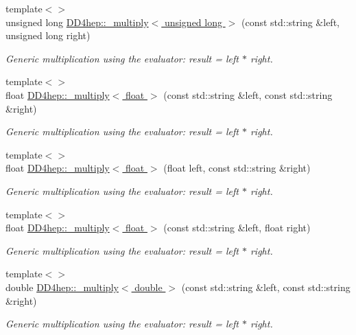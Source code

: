 \begin{DoxyCompactItemize}
{\footnotesize template$<$$>$ }\\unsigned long \hyperlink{group___d_d4_h_e_p___g_e_o_m_e_t_r_y_ga97440d35af9ad225e4307321a7735e59}{D\+D4hep\+::\+\_\+multiply$<$ unsigned long $>$} (const std\+::string \&left, unsigned long right)
\begin{DoxyCompactList}\small\item\em Generic multiplication using the evaluator\+: result = left $\ast$ right. \end{DoxyCompactList}\item 
{\footnotesize template$<$$>$ }\\float \hyperlink{group___d_d4_h_e_p___g_e_o_m_e_t_r_y_ga423913783efc6234ea872caa04c39917}{D\+D4hep\+::\+\_\+multiply$<$ float $>$} (const std\+::string \&left, const std\+::string \&right)
\begin{DoxyCompactList}\small\item\em Generic multiplication using the evaluator\+: result = left $\ast$ right. \end{DoxyCompactList}\item 
{\footnotesize template$<$$>$ }\\float \hyperlink{group___d_d4_h_e_p___g_e_o_m_e_t_r_y_ga745f4ee0b4b15f86d4992d11c7ca6f15}{D\+D4hep\+::\+\_\+multiply$<$ float $>$} (float left, const std\+::string \&right)
\begin{DoxyCompactList}\small\item\em Generic multiplication using the evaluator\+: result = left $\ast$ right. \end{DoxyCompactList}\item 
{\footnotesize template$<$$>$ }\\float \hyperlink{group___d_d4_h_e_p___g_e_o_m_e_t_r_y_gac92210239021647a7dc57e2838002263}{D\+D4hep\+::\+\_\+multiply$<$ float $>$} (const std\+::string \&left, float right)
\begin{DoxyCompactList}\small\item\em Generic multiplication using the evaluator\+: result = left $\ast$ right. \end{DoxyCompactList}\item 
{\footnotesize template$<$$>$ }\\double \hyperlink{group___d_d4_h_e_p___g_e_o_m_e_t_r_y_ga39814ce821031db89d1f61da38e09580}{D\+D4hep\+::\+\_\+multiply$<$ double $>$} (const std\+::string \&left, const std\+::string \&right)
\begin{DoxyCompactList}\small\item\em Generic multiplication using the evaluator\+: result = left $\ast$ right. \end{DoxyCompactList}\item 

\end{DoxyCompactItemize}
